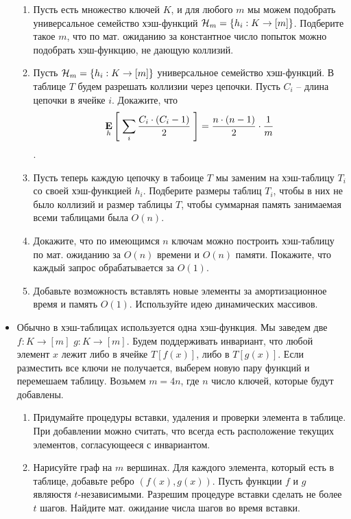 \begin{itemize}
\begin{enumerate}
    \item Пусть есть множество ключей $K$, и для любого $m$ мы можем подобрать
      универсальное семейство хэш-функций $\mathcal{H}_m = \{ h_i : K \rightarrow [m] \}$.
      Подберите такое $m$, что по мат. ожиданию за константное число попыток
      можно подобрать хэш-функцию, не дающую коллизий.

    \item Пусть $\mathcal{H}_m = \{ h_i : K \rightarrow [m] \}$ универсальное семейство 
      хэш-функций.  В таблице $T$ будем разрешать коллизии через цепочки. 
      Пусть $C_i$ -- длина цепочки в ячейке $i$. Докажите, что 
        $$\underset{h}{\textbf{E}}\left[ \;  \sum_i \frac{C_i \cdot (C_i - 1)}{2}  \;\right] = \frac{n \cdot (n - 1)}{2} \cdot \frac{1}{m}$$.

    \item Пусть теперь каждую цепочку в табоице $T$ мы заменим на хэш-таблицу 
    $T_i$ со своей хэш-функцией $h_i$. Подберите размеры таблиц $T_i$, чтобы 
    в них не было коллизий и размер таблицы $T$, чтобы суммарная память занимаемая
    всеми таблицами была $O(n)$.

    \item Докажите, что по имеющимся $n$ ключам можно построить хэш-таблицу по 
    мат. ожиданию за $O(n)$ времени и $O(n)$ памяти. Покажите, что каждый запрос
    обрабатывается за $O(1)$.
    
    \item Добавьте возможность вставлять новые элементы за амортизационное время и память
    $O(1)$. Используйте идею динамических массивов.

  \end{enumerate}

  \item Обычно в хэш-таблицах используется одна хэш-функция. Мы заведем две $f : K \rightarrow [m]$
   $g : K \rightarrow [m]$. Будем поддерживать инвариант, что любой элемент $x$ лежит либо в ячейке
    $T[f(x)]$, либо в $T[g(x)]$. Если разместить все ключи не получается, выберем
    новую пару функций и перемешаем таблицу. Возьмем $m = 4n$, где $n$ число ключей,
    которые будут добавлены.

    \begin{enumerate}
      \item Придумайте процедуры вставки, удаления и проверки элемента в 
        таблице. При добавлении можно считать, что всегда есть расположение текущих
        элементов, согласующееся с инвариантом.

      \item Нарисуйте граф на $m$ вершинах. Для каждого элемента, который есть в таблице,
        добавьте ребро $(f(x), g(x))$. Пусть функции $f$ и $g$ являюстя $t$-независимыми.
        Разрешим процедуре вставки сделать не более $t$ шагов. Найдите мат. ожидание
        числа шагов во время вставки.


\end{enumerate}
\end{itemize}
